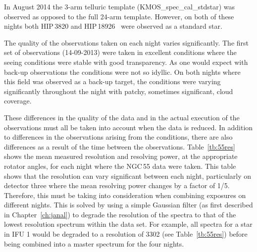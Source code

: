 In August 2014 the 3-arm telluric template (KMOS\_spec\_cal\_stdstar) was observed as opposed to the full 24-arm template. However, on both of these nights both HIP\,3820 and HIP\,18926~\citep[B3\,V;][]{1988mcts.book.....H} were observed as a standard star.

The quality of the observations taken on each night varies significantly.
The first set of observations (14-09-2013) were taken in excellent conditions where the seeing conditions were stable with good transparency.
As one would expect with back-up observations the conditions were not so idyllic.
On both nights where this field was observed as a back-up target, the conditions were varying significantly throughout the night with patchy, sometimes significant, cloud coverage.

These differences in the quality of the data and in the actual execution of the observations must all be taken into account when the data is reduced.
In addition to differences in the observations arising from the conditions, there are also differences as a result of the time between the observations.
Table~\ref{tb:55res} shows the mean measured resolution and resolving power, at the appropriate rotator angles, for each night where the NGC\,55 data were taken.
This table shows that the resolution can vary significant between each night, particularly on detector three where the mean resolving power changes by a factor of 1/5.
Therefore, this must be taking into consideration when combining exposures on different nights.
This is solved by using a simple Gaussian filter (as first described in Chapter~\ref{ch:janal}) to degrade the resolution of the spectra to that of the lowest resolution spectrum within the data set.
For example, all spectra for a star in IFU 1 would be degraded to a resolution of 3302 (see Table~\ref{tb:55res}) before being combined into a master spectrum for the four nights.

